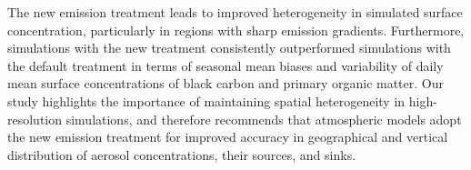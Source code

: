 The new emission treatment leads to improved heterogeneity in simulated surface concentration, particularly in regions with sharp emission gradients. Furthermore, simulations with the new treatment consistently outperformed simulations with the default treatment in terms of seasonal mean biases and variability of daily mean surface concentrations of black carbon and primary organic matter. Our study highlights the importance of maintaining spatial heterogeneity in high-resolution simulations, and therefore recommends that atmospheric models adopt the new emission treatment for improved accuracy in geographical and vertical distribution of aerosol concentrations, their sources, and sinks.
